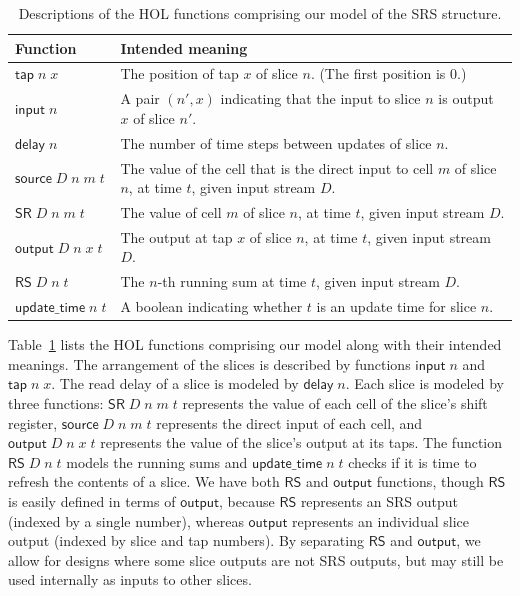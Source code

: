 \documentclass{llncs}
\begin{document}
\begin{table}[t]
\begin{tabular}{lp{}}
Function&Intended meaning\\
\hline
\(\mathsf{tap}\;n\;x\)&The position of tap $x$ of slice $n$. (The first position is $0$.)\\
\(\mathsf{input}\;n\)&A pair $(n',x)$ indicating that the input to slice $n$ is output $x$ of slice $n'$.\\
\(\mathsf{delay}\;n\)&The number of time steps between updates of slice $n$.\\
\(\mathsf{source}\;D\;n\;m\;t\)&The value of the cell that is the direct input to cell $m$ of slice $n$, at time $t$, given input stream $D$.\\
\(\mathsf{SR}\;D\;n\;m\;t\)&The value of cell $m$ of slice $n$, at time $t$, given input stream $D$.\\
\(\mathsf{output}\;D\;n\;x\;t\)&The output at tap $x$ of slice $n$, at time $t$, given input stream $D$.\\
\(\mathsf{RS}\;D\;n\;t\)&The $n$-th running sum at time $t$, given input stream $D$.\\
\(\mathsf{update\_time}\;n\;t\)&A boolean indicating whether $t$ is an update time for slice $n$.
\end{tabular}
\vspace{2ex}
\caption{
Descriptions of the HOL functions comprising our model of the SRS structure.
\label{tab:descriptions}
}
\end{table}

Table~\ref{tab:descriptions} lists the HOL functions comprising our model along with their intended meanings.
The arrangement of the slices is described by functions $\mathsf{input}\;n$ and $\mathsf{tap}\;n\;x$.
The read delay of a slice is modeled by $\mathsf{delay}\;n$.
Each slice is modeled by three functions: $\mathsf{SR}\;D\;n\;m\;t$ represents the value of each cell of the slice's shift register, $\mathsf{source}\;D\;n\;m\;t$ represents the direct input of each cell, and $\mathsf{output}\;D\;n\;x\;t$ represents the value of the slice's output at its taps.
The function $\mathsf{RS}\;D\;n\;t$ models the running sums and $\mathsf{update\_time}\;n\;t$ checks if it is time to refresh the contents of a slice.
We have both $\mathsf{RS}$ and $\mathsf{output}$ functions, though $\mathsf{RS}$ is easily defined in terms of $\mathsf{output}$, because $\mathsf{RS}$ represents an SRS output (indexed by a single number), whereas $\mathsf{output}$ represents an individual slice output (indexed by slice and tap numbers).
By separating $\mathsf{RS}$ and $\mathsf{output}$, we allow for designs where some slice outputs are not SRS outputs, but may still be used internally as inputs to other slices.
\end{document}
